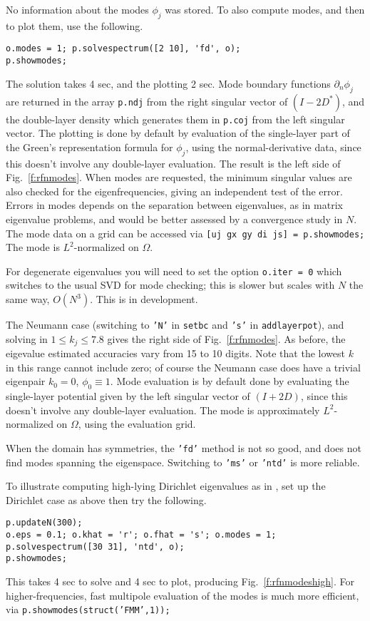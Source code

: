 No information about the modes $\phi_j$ was stored.
To also compute modes, and then to plot them, use the following.
\begin{verbatim}
o.modes = 1; p.solvespectrum([2 10], 'fd', o);
p.showmodes;
\end{verbatim}
The solution takes 4 sec, and the plotting 2 sec.
Mode boundary functions $\partial_n\phi_j$ are returned in the array
{\tt p.ndj} from the right singular vector of $(I-2D^\ast)$,
and the double-layer density which generates them in {\tt p.coj}
from the left singular vector.
The plotting is done by default
by evaluation of the single-layer part of the
Green's representation formula for $\phi_j$, using the
normal-derivative data, since this doesn't involve any double-layer evaluation.
The result is the left side of Fig.~\ref{f:rfnmodes}.
When modes are requested, the minimum singular values are also
checked for the eigenfrequencies, giving an independent test of the error.
Errors in modes depends on the separation between eigenvalues,
as in matrix eigenvalue problems, and would be better assessed by a convergence
study in $N$.
The mode data on a grid can be accessed via
{\tt [uj gx gy di js] = p.showmodes;}
The mode is $L^2$-normalized on $\Omega$.


For degenerate eigenvalues you will need to set the option
{\tt o.iter = 0} which switches to the usual SVD for mode checking;
this is slower but scales with $N$ the same way, $O(N^3)$.
This is in development.

The Neumann case (switching to {\tt 'N'} in {\tt setbc} and {\tt 's'} in
{\tt addlayerpot}), and solving in $1\le k_j \le 7.8$
gives the right side of Fig.~\ref{f:rfnmodes}.
As before, the eigevalue estimated accuracies vary from 15 to 10 digits.
Note that the lowest $k$ in this range cannot include zero;
of course the Neumann case does have a trivial eigenpair
$k_0=0$, $\phi_0 \equiv 1$.
Mode evaluation is by default done by evaluating the single-layer potential
given by the left singular vector of $(I+2D)$,
since this doesn't involve any double-layer evaluation.
The mode is approximately $L^2$-normalized on $\Omega$, using the
evaluation grid.


When the domain has symmetries, the {\tt 'fd'} method is not so good,
and does not find modes spanning the eigenspace.
Switching to {\tt 'ms'} or {\tt 'ntd'} is more reliable.


To illustrate computing high-lying Dirichlet eigenvalues as in \cite{sca},
set up the Dirichlet case as above then try the following.
\begin{verbatim}
p.updateN(300);
o.eps = 0.1; o.khat = 'r'; o.fhat = 's'; o.modes = 1;
p.solvespectrum([30 31], 'ntd', o);
p.showmodes;
\end{verbatim}
This takes 4 sec to solve and 4 sec to plot, producing
Fig.~\ref{f:rfnmodeshigh}.
For higher-frequencies, fast multipole evaluation of the modes is
much more efficient, via {\tt p.showmodes(struct('FMM',1));}

